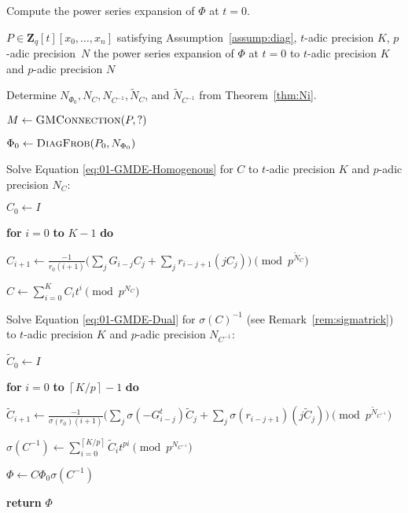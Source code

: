 \documentclass[a4paper,11pt]{article}
\numberwithin{equation}{section}
\providecommand{\ceil}[1]{\left\lceil#1\right\rceil}   %
\newcommand{\ZZ}{\mathbf{Z}} %
\theoremstyle{definition}
\begin{document}
\begin{algorithm}
\caption{Compute the power series expansion of $\Phi$ at $t=0$.}
\label{alg:expansion}
\begin{algorithmic}
\vspace{1mm}
\Require $P \in \ZZ_q[t][x_0,\ldots,x_n]$ satisfying Assumption~\ref{assump:diag}, $t$-adic precision $K$, $p$-adic precision~$N$
\Ensure  the power series expansion of $\Phi$ at $t=0$ to $t$-adic precision $K$ and $p$-adic precision $N$
\State \begin{compactenum}[{\hspace{6pt}} 1.] \vspace{-1.24em}
\item Determine $N_{\Phi_0},N_C,N_{C^{-1}},\tilde{N}_C$, and $\tilde{N}_{C^{-1}}$ from Theorem~\ref{thm:Ni}.
\item $M \gets \textsc{GMConnection}(P,?)$
\item $\Phi_0 \gets \textsc{DiagFrob}(P_0,N_{\Phi_0})$
\item Solve Equation \eqref{eq:01-GMDE-Homogenous} for $C$ to $t$-adic precision $K$ and $p$-adic precision $N_{C}$:
\begin{compactenum}[a.] 
\item[] $C_0 \gets I$
\item[] \textbf{for} $i=0$ \textbf{to} $K-1$ \textbf{do} 
\item[] \hspace{0.6em} $C_{i+1} \gets \frac{-1}{r_0 (i+1)} \biggl(\sum_j G_{i-j} C_j + \sum_j r_{i-j+1} (j C_j) \biggr) \pmod{p^{\tilde{N}_C}}$
\item[] $C \gets \sum_{i=0}^K C_i t^i \pmod{p^{N_C}}$
\end{compactenum}
\item Solve Equation \eqref{eq:01-GMDE-Dual} for $\sigma(C)^{-1}$ (see Remark~\ref{rem:sigmatrick}) to $t$-adic precision $K$ and $p$-adic precision $N_{C^{-1}}$:
\begin{compactenum}[a.]
\item[] $\tilde{C}_0 \gets I$
\item[] \textbf{for} $i=0$ \textbf{to} $\ceil{K/p}-1$ \textbf{do}
\item[] \hspace{0.6em} $\tilde{C}_{i+1} \gets  \frac{-1}{\sigma(r_0)(i+1)} \biggl(\sum_j \sigma(-G_{i-j}^t) \tilde{C}_j + \sum_j \sigma(r_{i-j+1}) (j \tilde{C}_j) \biggr) \pmod{p^{\tilde{N}_{C^{-1}}}}$
\item[] $\sigma(C^{-1}) \gets \sum_{i=0}^{\ceil{K/p}} \tilde{C}_i t^{pi} \pmod{p^{N_{C^{-1}}}}$
\end{compactenum}
\item $\Phi \gets C \Phi_0 \sigma(C^{-1})$
\item \textbf{return} $\Phi$
\end{compactenum}
\EndProcedure
\end{algorithmic}
\end{algorithm}
\end{document}
